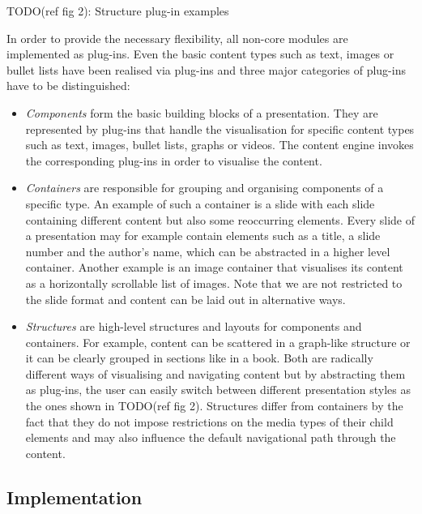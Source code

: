 \documentclass[a4paper,12pt]{report}
\begin{document}
     TODO(ref fig 2): Structure plug-in examples

     In order to provide the necessary flexibility, all non-core modules are
     implemented as plug-ins. Even the basic content types such as text, images or
     bullet lists have been realised via plug-ins and three major categories of
     plug-ins have to be distinguished:

     \begin{itemize}

      \item \emph{Components} form the basic building blocks of a presentation.
      They are represented by plug-ins that handle the visualisation for specific
      content types such as text, images, bullet lists, graphs or videos. The content
      engine invokes the corresponding plug-ins in order to visualise the content.

      \item \emph{Containers} are responsible for grouping and organising
      components of a specific type. An example of such a container is a slide with
      each slide containing different content but also some reoccurring elements.
      Every slide of a presentation may for example contain elements such as a title,
      a slide number and the author's name, which can be abstracted in a higher level
      container. Another example is an image container that visualises its content as
      a horizontally scrollable list of images. Note that we are not restricted to
      the slide format and content can be laid out in alternative ways.

      \item \emph{Structures} are high-level structures and layouts for
      components and containers. For example, content can be scattered in a
      graph-like structure or it can be clearly grouped in sections like in a book.
      Both are radically different ways of visualising and navigating content but by
      abstracting them as plug-ins, the user can easily switch between different
      presentation styles as the ones shown in TODO(ref fig 2). Structures differ
      from containers by the fact that they do not impose restrictions on the media
      types of their child elements and may also influence the default navigational
      path through the content.

     \end{itemize}

   \subsection{Implementation}
\end{document}
